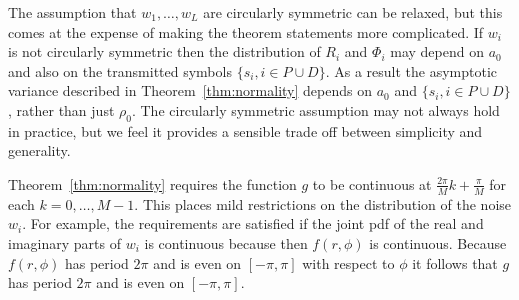 \documentclass[journal]{IEEEtran}
\begin{document}
The assumption that $w_1, \dots, w_L$ are circularly symmetric can be relaxed, but this comes at the expense of making the theorem statements more complicated.  If $w_i$ is not circularly symmetric then the distribution of $R_i$ and $\Phi_i$ may depend on $a_0$ and also on the transmitted symbols $\{s_i,i \in P \cup D\}$.  As a result the asymptotic variance described in Theorem~\ref{thm:normality} depends on $a_0$ and $\{s_i,i \in P \cup D\}$, rather than just $\rho_0$.  The circularly symmetric assumption may not always hold in practice, but we feel it provides a sensible trade off between simplicity and generality.  


Theorem~\ref{thm:normality} requires the function $g$ to be continuous at $\tfrac{2\pi}{M}k + \tfrac{\pi}{M}$ for each $k = 0, \dots, M-1$.  This places mild restrictions on the distribution of the noise $w_i$.  For example, the requirements are satisfied if the joint pdf of the real and imaginary parts of $w_i$ is continuous because then 
$f(r,\phi)$ is continuous.  Because $f(r,\phi)$ has period $2\pi$ and is even on $[-\pi,\pi]$ with respect to $\phi$ it follows that $g$ has period $2\pi$ and is even on $[-\pi, \pi]$.

\end{document}
